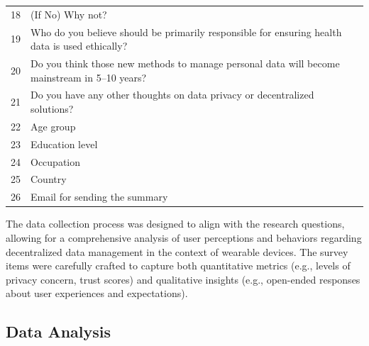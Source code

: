 \begin{table}[ht]
\begin{tabular}{p{1.5cm} p{13cm}}
			18 & (If No) Why not? \\
			19 & Who do you believe should be primarily responsible for ensuring health data is used ethically? \\
			20 & Do you think those new methods to manage personal data will become mainstream in 5–10 years? \\
			21 & Do you have any other thoughts on data privacy or decentralized solutions? \\
			22 & Age group \\
			23 & Education level \\
			24 & Occupation \\
			25 & Country \\
			26 & Email for sending the summary \\
			\bottomrule
		\end{tabular}
		\label{tab:survey_questions}
	\end{table}
	\clearpage

	The data collection process was designed to align with the research questions, allowing for a comprehensive analysis of user perceptions and behaviors regarding decentralized data management in the context of wearable devices. The survey items were carefully crafted to capture both quantitative metrics (e.g., levels of privacy concern, trust scores) and qualitative insights (e.g., open-ended responses about user experiences and expectations).
\subsection{Data Analysis}
